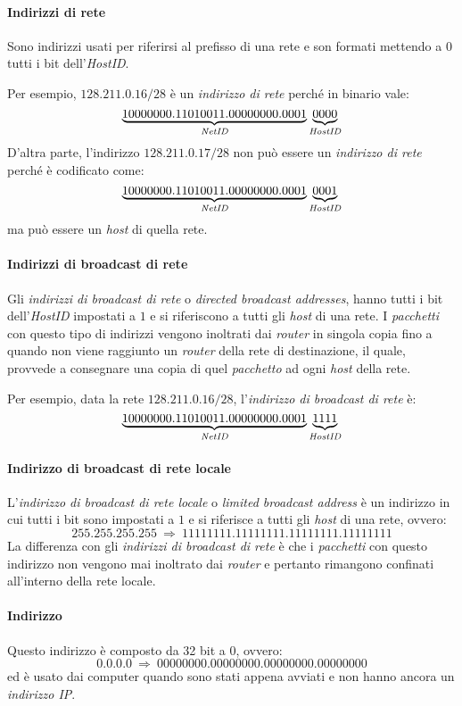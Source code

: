 \paragraph{Indirizzi di rete}
Sono indirizzi usati per riferirsi al prefisso di una rete e son formati mettendo
a $0$ tutti i bit dell'\emph{HostID}.

Per esempio, $128.211.0.16/28$ è un \emph{indirizzo di rete} perché in binario
vale:
\[\underbrace{10000000.11010011.00000000.0001}_{\emph{NetID}}\underbrace{0000}_{\emph{HostID}}\]
D'altra parte, l'indirizzo $128.211.0.17/28$ non può essere un \emph{indirizzo di
rete} perché è codificato come:
\[\underbrace{10000000.11010011.00000000.0001}_{\emph{NetID}}\underbrace{0001}_{\emph{HostID}}\]
ma può essere un \emph{host} di quella rete.

\paragraph{Indirizzi di broadcast di rete}
Gli \emph{indirizzi di broadcast di rete} o \emph{directed broadcast addresses},
hanno tutti i bit dell'\emph{HostID} impostati a $1$ e si riferiscono a tutti
gli \emph{host} di una rete. I \emph{pacchetti} con questo tipo di indirizzi
vengono inoltrati dai \emph{router} in singola copia fino a quando non viene
raggiunto un \emph{router} della rete di destinazione, il quale, provvede a
consegnare una copia di quel \emph{pacchetto} ad ogni \emph{host} della rete.

Per esempio, data la rete $128.211.0.16/28$, l'\emph{indirizzo di broadcast di
rete} è:
\[\underbrace{10000000.11010011.00000000.0001}_{\emph{NetID}}\underbrace{1111}_{\emph{HostID}}\]

\paragraph{Indirizzo di broadcast di rete locale}
L'\emph{indirizzo di broadcast di rete locale} o \emph{limited broadcast
address} è un indirizzo in cui tutti i bit sono impostati a $1$ e si
riferisce a tutti gli \emph{host} di una rete, ovvero:
\[255.255.255.255\ \Rightarrow\ 11111111.11111111.11111111.11111111\]
La differenza con gli \emph{indirizzi di broadcast di rete} è che i \emph{pacchetti}
con questo indirizzo non vengono mai inoltrato dai \emph{router} e pertanto
rimangono confinati all'interno della rete locale.

\paragraph{Indirizzo }
Questo indirizzo è composto da 32 bit a $0$, ovvero:
\[0.0.0.0\ \Rightarrow\ 00000000.00000000.00000000.00000000\]
ed è usato dai computer quando sono stati appena avviati e non hanno ancora un
\emph{indirizzo IP}.

